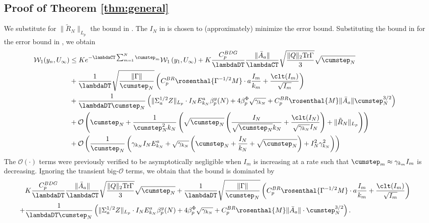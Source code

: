 \documentclass[11pt]{article}
\begin{document}
\subsection{Proof of Theorem \ref{thm:general}}\label{app:general}
We substitute for $\lVert \tilde{R}_N \rVert_{L_p}$ the bound in . 
The $I_N$ in  is chosen to (approximately) minimize the error bound. 
Substituting the bound in  for the error bound in , we obtain
\begin{equation}\label{eq:thm1_all_terms}
\begin{split}
    \mathcal{W}_{1}(y_n, U_\infty) 
    &\leq 
    K e^{-\lambdaCT \sum_{m=1}^N \cumstep_m} \mathcal{W}_1 \left(y_1, U_\infty \right) 
    + K\frac{C_p^{BDG}}{\lambdaDT} 
    \frac{\lVert \bar{A}_a \rVert }{\lambdaCT} \sqrt{\frac{\lVert Q \rVert_2\mathrm{Tr} \Gamma}{3}} \sqrt{\cumstep_N}
    \\ &
    + \frac{1}{\lambdaDT} 
    \sqrt{\frac{\lVert \Gamma \rVert}{\cumstep_N}}  \left( C_p^{BR} \rosenthal{\Gamma^{-1/2} M} \cdot a \frac{I_m}{k_m} + \frac{\clt(I_m)}{\sqrt{I_m}} \right)
    \\ &
    + \frac{1}{\lambdaDT \cumstep_N} \left(          \lVert \Sigma_a^{1/2}Z \rVert_{L_p} \cdot I_N E_{k_N}^a \beta_p^y (N)
    +
    4    \beta_p^\Phi \sqrt{\gamma_{k_N}}
    + 
        C_p^{BR} \rosenthal{ M} \lVert \bar{A}_a \rVert \cumstep_N^{3/2} \right)
    \\ &
    + \mathcal{O}\left(\cumstep_N 
    +
    \frac{1}{\cumstep_N^2 k_N} \left( \sqrt{\cumstep_N} \left(\frac{I_N}{\sqrt{\cumstep_N} k_N} + \frac{ \clt(I_N)}{\sqrt{\gamma_{k_N}} I_N} \right) + \lVert \tilde{R}_N \rVert_{L_p} \right)
    \right)
    \\ &
    +     
    \mathcal{O}\left( \frac{1}{\cumstep_N} \left( \gamma_{k_N} I_N E_{k_N}^a + \sqrt{\gamma_{k_N}} \left( \cumstep_N + \frac{I_N}{k_N} + \sqrt{\cumstep_N}\right) 
    + I_N^2 \gamma_{k_N}^2
    \right)\right)     
\end{split}
\end{equation}
The $\mathcal{O}(\cdot)$ terms were previously verified to be asymptotically negligible when $I_m$ is increasing at a rate such that $\cumstep_m \approx \gamma_{k_m} I_m$ is decreasing.
Ignoring the transient big-$\mathcal{O}$ terms, we obtain that the bound is dominated by
\begin{equation}\label{eq:thm1_dominant}
\begin{split}
     &K\frac{C_p^{BDG}}{\lambdaDT} 
    \frac{\lVert \bar{A}_a \rVert }{\lambdaCT} \sqrt{\frac{\lVert Q \rVert_2\mathrm{Tr} \Gamma}{3}} \sqrt{\cumstep_N}
     + \frac{1}{\lambdaDT} 
    \sqrt{\frac{\lVert \Gamma \rVert}{\cumstep_N}} \left( C_p^{BR} \rosenthal{\Gamma^{-1/2} M} \cdot a \frac{I_m}{k_m} + \frac{\clt(I_m)}{\sqrt{I_m}}\right)
    \\  +& 
     \frac{1}{\lambdaDT \cumstep_N} \left(          \lVert \Sigma_a^{1/2}Z \rVert_{L_p} \cdot I_N E_{k_N}^a \beta_p^y (N)
    +
    4    \beta_p^\Phi \sqrt{\gamma_{k_N}}
    + 
        C_p^{BR} \rosenthal{M}\lVert \bar{A}_a \rVert \cdot \cumstep_N^{3/2} \right) 
        .    
\end{split}    
\end{equation}
\end{document}
